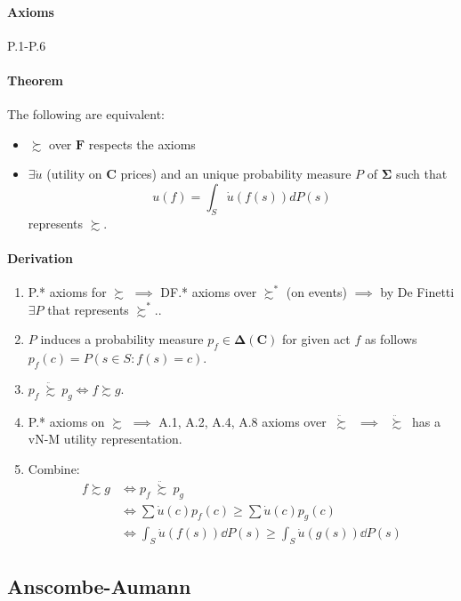\documentclass[14pt]{extarticle}
\newcommand{\ddsuccsim}{\ \ddot \succsim \ }
\begin{document}
\paragraph{Axioms} P.1-P.6

\paragraph{Theorem} The following are equivalent:
\begin{itemize}
	\item $\succsim$ over $\bm F$ respects the axioms
	\item $\exists \dot u$ (utility on $\bm C$ prices) and
	      an unique probability measure $P$ of $\bm \Sigma$
	      such that
	      \[
		      u(f) = \int_S \dot u(f(s)) dP(s)
	      \]
	      represents $\succsim$.
\end{itemize}

\paragraph{Derivation}
\begin{enumerate}
	\item P.* axioms for $\succsim$ $\implies$ DF.* axioms over $\succsim^*$ (on events)
	      $\implies$ by De Finetti $\exists P$ that represents $\succsim^*$..
	\item $P$ induces a probability measure $p_f \in \bm \Delta(\bm C)$ for  given act $f$
	      as follows $p_f(c) = P(s \in S : f(s) = c)$.
	\item $p_f \ddsuccsim p_g \iff f \succsim g$.
	\item P.* axioms on $\succsim$ $\implies$ A.1, A.2, A.4, A.8 axioms over $\ddsuccsim$ $\implies$
	      $\ddsuccsim$ has a vN-M utility representation.
	\item Combine:
	      \begin{align*}
		      f \succsim g & \iff p_f \ddsuccsim p_g                                             \\
		                   & \iff \sum \dot u(c)p_f(c) \geq \sum \dot u(c)p_g(c)                 \\
		                   & \iff \int_S \dot u(f(s)) \dd P(s) \geq \int_S \dot u(g(s)) \dd P(s)
	      \end{align*}
\end{enumerate}

\subsection{Anscombe-Aumann}
\end{document}
